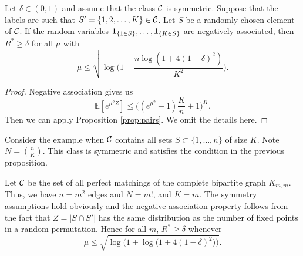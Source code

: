 \documentclass[10pt, oneside]{article}
\begin{document}
\begin{prop}
  \label{negass}
  Let $\delta\in(0,1)$ and assume that the class ${\mathcal C}$ is symmetric. Suppose that the labels are such
  that $S'=\{1,2,\ldots,K\} \in{\mathcal C}$. Let $S$ be a randomly chosen
  element of ${\mathcal C}$.
  If the random variables
  ${\bf 1}_{\{ 1 \in S \}},\ldots,{\bf 1}_{\{ K\in S \}}$ are
  negatively associated,
  then
  $R^*\ge\delta$ for all $\mu$ with
  \[
  \mu\le\sqrt{\log\biggl(1+\frac{n\log(1+4(1-\delta)^2)}{K^2} \biggr)}.
  \]
\end{prop}
\begin{proof}
  Negative association gives us
  $$\mathbb{E}[ e^{\mu^2 Z}]\le \biggl( (e^{\mu^2} -1 ) \frac{K}{n} +1 \biggr)^K.$$
  Then we can apply Proposition \ref{prop:pairs}. We omit the details here.
\end{proof}
\begin{exmp}
  Consider the example when ${\mathcal C}$ contains all sets $S \subset\{1,\ldots ,n\}$ of size $K$. Note $N={n\choose K}$. This class is symmetric and satisfies the condition in the previous proposition.
\end{exmp}

\begin{exmp}
  \label{exmp:Perfect Matchings}
  Let ${\mathcal C}$ be the set of all perfect matchings of the complete bipartite graph $K_{m,m}$. Thus, we have $n=m^2$ edges and $N=m!$, and $K=m$.
  The symmetry assumptions hold obviously and the negative association property follows from the fact that $Z=|S\cap S'|$ has the same
distribution as the number of fixed points in a random permutation. Hence for all $m$, $R^* \ge\delta$ whenever
\[
\mu\le\sqrt{\log\bigl(1+\log\bigl(1+4(1-\delta)^2\bigr)\bigr)}.
\]
\end{exmp}
\end{document}

